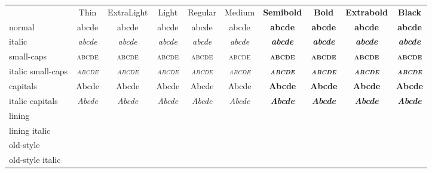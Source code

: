 \documentclass[11pt]{standalone}
\newcommand*\spA{abcde}
\newcommand*\spB{01469}
\newcommand*\spr[1][\spA]{& #1 & #1 & #1 & #1 & #1 & #1 & #1 & #1 & #1\\}
\begin{document}
\begin{tabular}{
		>{}l
		>{\ralewaythin}c
		>{\ralewayextra}c
		>{\ralewaylight}c
		>{\raleway}c
		>{\ralewaymedium}c
		>{\ralewaylight\bfseries}c
		>{\raleway\bfseries}c
		>{\ralewayextra\bfseries}c
		>{\ralewaythin\bfseries}c }
	& Thin & ExtraLight & Light & Regular & Medium & Semibold & Bold & Extrabold & Black \\
	normal               \spr
	italic               \spr[\itshape\spA]
	small-caps           \spr[\scshape\spA]
	italic small-caps    \spr[\scshape\itshape\spA]
	capitals             \spr[\MakeUppercase\spA]
	italic capitals      \spr[\itshape\MakeUppercase\spA]
	lining               \spr[\liningnums{\spB}]
	lining italic        \spr[\liningnums{\itshape\spB}]
	old-style            \spr[\oldstylenums{\spB}]
	old-style italic     \spr[\oldstylenums{\itshape\spB}]
\end{tabular}
\end{document}
